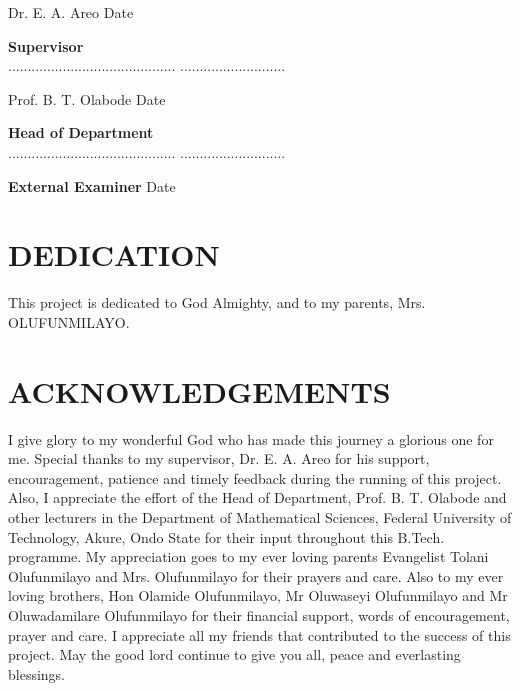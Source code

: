 \documentclass[12pt]{report}
\begin{document}
Dr. E. A. Areo \hspace{13cm} Date

\hspace{6mm}\textbf{Supervisor}\\
[2cm] 

\noindent........................................... \hspace{10.7cm}
...........................

Prof. B. T. Olabode \hspace{12.3cm} Date

\noindent\hspace{4mm}\textbf{Head of Department}\\
[2cm] 

\noindent........................................... \hspace{10.7cm}
...........................

\textbf{External Examiner} \hspace{12.3cm} Date



\chapter*{DEDICATION}
%
\noindent This project is dedicated to God Almighty, and to my parents, Mrs. OLUFUNMILAYO.

\chapter*{ACKNOWLEDGEMENTS}
%
\noindent I give glory to my wonderful God who has made this journey a glorious one for me. Special thanks to my supervisor, Dr. E. A. Areo for his support, encouragement, patience and timely feedback during the running of this project. Also, I appreciate the effort of the Head of Department, Prof. B. T. Olabode and other lecturers in the Department of Mathematical Sciences, Federal University of Technology, Akure, Ondo State for their input throughout this B.Tech. programme. My appreciation goes to my ever loving parents Evangelist Tolani Olufunmilayo and Mrs. Olufunmilayo for their prayers and care. Also to my ever loving brothers, Hon Olamide Olufunmilayo, Mr Oluwaseyi Olufunmilayo and Mr Oluwadamilare Olufunmilayo for their financial support, words of encouragement, prayer and care. I appreciate all my friends that contributed to the success of this project. May the good lord continue to give you all, peace and everlasting blessings. 
\end{document}

